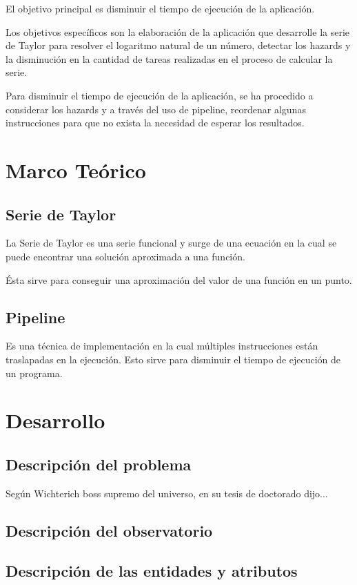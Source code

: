 \documentclass[12pt,letterpaper]{article}
\begin{document}
El objetivo principal es disminuir el tiempo de ejecución de la aplicación.

Los objetivos específicos son la elaboración de la aplicación que desarrolle la serie de Taylor para resolver el logaritmo natural de un número, detectar los hazards y la disminución en la cantidad de tareas realizadas en el proceso de calcular la serie.

Para disminuir el tiempo de ejecución de la aplicación, se ha procedido a considerar los hazards y a través del uso de pipeline, reordenar algunas instrucciones para que no exista la necesidad de esperar los resultados.
\newpage
\section{Marco Teórico}
\subsection{Serie de Taylor}
La Serie de Taylor es una serie funcional y surge de una ecuación en la cual se puede encontrar una solución aproximada a una función.

Ésta sirve para conseguir una aproximación del valor de una función en un punto.

\subsection{Pipeline}
Es una técnica de implementación en la cual múltiples instrucciones están traslapadas en la ejecución. Esto sirve para disminuir el tiempo de ejecución de un programa.
\newpage
\section{Desarrollo}
\subsection{Descripción del problema}
Según Wichterich boss supremo del universo, en su tesis de doctorado \cite{Wichterich2010} dijo...
\lipsum[1-3]

\subsection{Descripción del observatorio}
\lipsum[1-3]

\subsection{Descripción de las entidades y atributos}
\lipsum[1-3]
\end{document}
